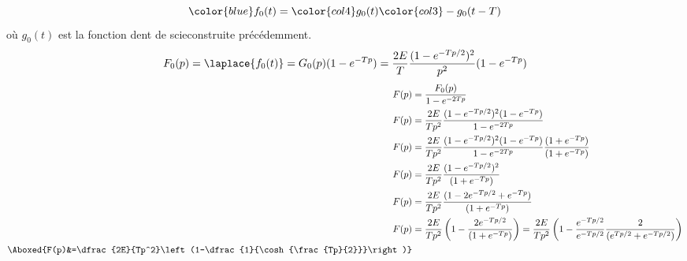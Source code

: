 \[
\color{blue}f_0(t)=\color{col4}g_0(t)\color{col3}-g_0(t-T)
\]
où $g_0(t)$ est la fonction \og dent de scie\fg construite précédemment.
\[
F_0(p)=\laplace{f_0(t)}=G_0(p)(1-e^{-Tp})
=\dfrac{2E}{T}\dfrac{(1-e^{-Tp/2})^2}{p^2}(1-e^{-Tp})
\]
\begin{align*}
    F(p)&=\dfrac{F_0(p)}{1-e^{-2Tp}} \\
    F(p)&=\dfrac{2E}{Tp^2}\dfrac{(1-e^{-Tp/2})^2(1-e^{-Tp})}{1-e^{-2Tp}}\\
    F(p)&=\dfrac{2E}{Tp^2}\dfrac{(1-e^{-Tp/2})^2(1-e^{-Tp})}{1-e^{-2Tp}}
                          \dfrac{(1+e^{-Tp})}{(1+e^{-Tp})}\\
    F(p)&=\dfrac{2E}{Tp^2}\dfrac{(1-e^{-Tp/2})^2}{(1+e^{-Tp})}\\
    F(p)&=\dfrac{2E}{Tp^2}\dfrac{(1-2e^{-Tp/2}+e^{-Tp})}{(1+e^{-Tp})}\\
    F(p)&=\dfrac{2E}{Tp^2}\left(1-\dfrac{2e^{-Tp/2}}{(1+e^{-Tp})}\right)
         =\dfrac{2E}{Tp^2}\left(1-\dfrac{e^{-Tp/2}}{e^{-Tp/2}}
                                  \dfrac{2}{(e^{Tp/2}+e^{-Tp/2})}\right)\\
\Aboxed{F(p)&=\dfrac{2E}{Tp^2}\left(1-\dfrac{1}{\cosh{\frac{Tp}{2}}}\right)}
\end{align*}



